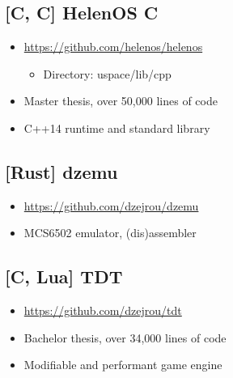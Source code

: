 \documentclass[8pt]{article}
\def\cpp{{C\nolinebreak[4]\hspace{-.05em}\raisebox{.4ex}{\tiny\bf ++\xspace}}}
\begin{document}
\begin{minipage}[t]{0.45\textwidth}
\centering

\subsection*{[C, \cpp] HelenOS \cpp}
\begin{itemize}
    \item \url{https://github.com/helenos/helenos}
    \begin{itemize}
        \item Directory: uspace/lib/cpp
    \end{itemize}
    \item Master thesis, over 50,000 lines of code
    \item C++14 runtime and standard library
\end{itemize}

\subsection*{[Rust] dzemu}
\begin{itemize}
    \item \url{https://github.com/dzejrou/dzemu}
    \item MCS6502 emulator, (dis)assembler
\end{itemize}

\subsection*{[\cpp, Lua] TDT}
\begin{itemize}
    \item \url{https://github.com/dzejrou/tdt}
    \item Bachelor thesis, over 34,000 lines of code
    \item Modifiable and performant game engine
\end{itemize}

\end{minipage}%
\hfill
\end{document}
